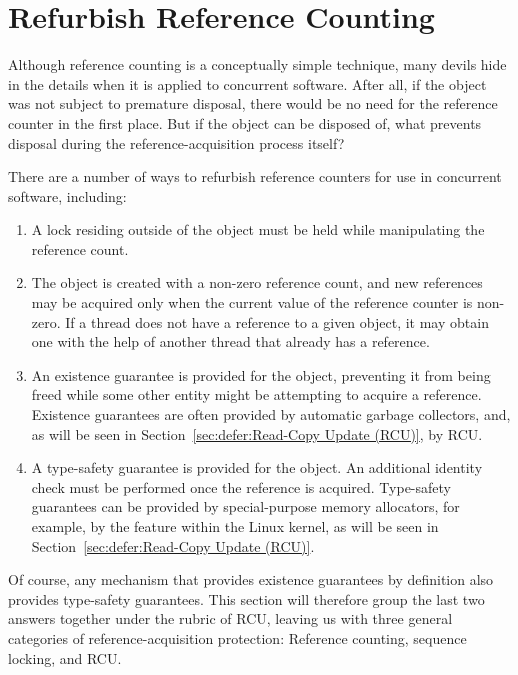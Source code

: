 
\section{Refurbish Reference Counting}
\label{sec:together:Refurbish Reference Counting}

Although reference counting is a conceptually simple technique,
many devils hide in the details when it is applied to concurrent
software.
After all, if the object was not subject to premature disposal,
there would be no need for the reference counter in the first place.
But if the object can be disposed of, what prevents disposal during
the reference-acquisition process itself?

There are a number of ways to refurbish reference counters for
use in concurrent software, including:

\begin{enumerate}
\item	A lock residing outside of the object must be held while
	manipulating the reference count.
\item	The object is created with a non-zero reference count, and new
	references may be acquired only when the current value of
	the reference counter is non-zero.
	If a thread does not have a reference to a given object,
	it may obtain one with the help of another thread that
	already has a reference.
\item	An existence guarantee is provided for the object, preventing
	it from being freed while some other
	entity might be attempting to acquire a reference.
	Existence guarantees are often provided by automatic
	garbage collectors, and, as will be seen in
	Section~\ref{sec:defer:Read-Copy Update (RCU)}, by RCU.
\item	A type-safety guarantee is provided for the object.
	An additional identity check must be performed once
	the reference is acquired.
	Type-safety guarantees can be provided by special-purpose
	memory allocators, for example, by the
	 feature within the Linux kernel,
	as will be seen in Section~\ref{sec:defer:Read-Copy Update (RCU)}.
\end{enumerate}

Of course, any mechanism that provides existence guarantees
by definition also provides type-safety guarantees.
This section will therefore group the last two answers together under the
rubric of RCU, leaving us with three general categories of
reference-acquisition protection: Reference counting, sequence
locking, and RCU.

